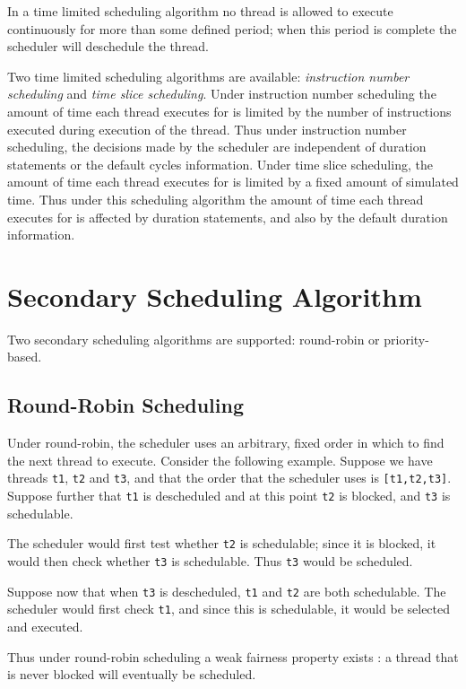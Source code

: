 \documentclass{overturerepchap}
\begin{document}
In a time limited scheduling algorithm no thread is allowed to execute
continuously for more than some defined period; when this period is
complete the scheduler will deschedule the thread.

Two time limited scheduling algorithms are available:
\emph{instruction number scheduling} and \emph{time slice
scheduling}. Under instruction number scheduling the amount of time
each thread executes for is limited by the number of instructions
executed during execution of the thread. Thus under instruction number
scheduling, the decisions made by the scheduler are independent of
duration statements or the default cycles information.  Under time
slice scheduling, the amount of time each thread executes for is
limited by a fixed amount of simulated time. Thus under this
scheduling algorithm the amount of time each thread executes for is
affected by duration statements, and also by the default duration
information.

\section{Secondary Scheduling Algorithm}

Two secondary scheduling algorithms are supported: round-robin or
priority-based.

\subsection{Round-Robin Scheduling}

Under round-robin, the scheduler uses an arbitrary, fixed order in
which to find the next thread to execute. Consider the following
example. Suppose we have threads \texttt{t1}, \texttt{t2} and
\texttt{t3}, and that the order that the scheduler uses is
\texttt{[t1,t2,t3]}. Suppose further that \texttt{t1} is descheduled
and at this point \texttt{t2} is blocked, and \texttt{t3} is
schedulable.

The scheduler would first test whether \texttt{t2} is schedulable;
since it is blocked, it would then check whether \texttt{t3} is
schedulable. Thus \texttt{t3} would be scheduled.  

Suppose now that when \texttt{t3} is descheduled, \texttt{t1} and
\texttt{t2} are both schedulable. The scheduler would first check
\texttt{t1}, and since this is schedulable, it would be selected and
executed.

Thus under round-robin scheduling a weak fairness property exists
\cite{Lamport91}: a thread that is never blocked will eventually be
scheduled.
\end{document}
